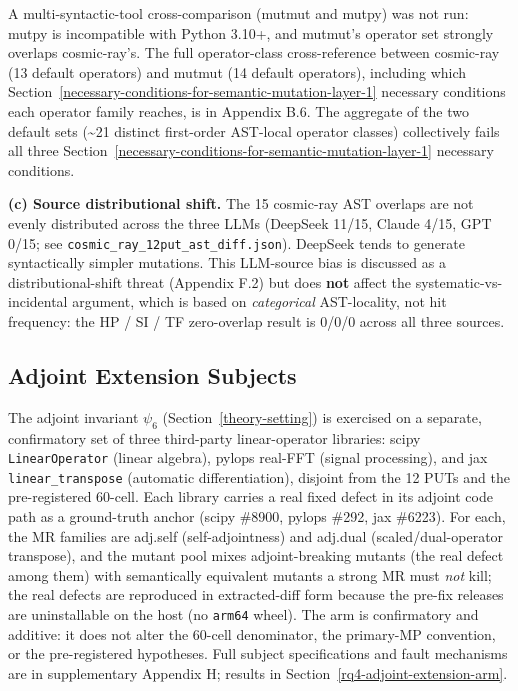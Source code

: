 \documentclass[manuscript,screen,review]{acmart}
\begin{document}
A multi-syntactic-tool cross-comparison (mutmut and mutpy) was not run:
mutpy is incompatible with Python 3.10+, and mutmut's operator
set strongly overlaps cosmic-ray's. The full operator-class
cross-reference between cosmic-ray (13 default operators) and mutmut (14
default operators), including which Section~\ref{necessary-conditions-for-semantic-mutation-layer-1} necessary conditions each
operator family reaches, is in Appendix B.6. The aggregate of the two
default sets (\textasciitilde21 distinct first-order AST-local operator
classes) collectively fails all three Section~\ref{necessary-conditions-for-semantic-mutation-layer-1} necessary conditions.

\textbf{(c) Source distributional shift.} The 15 cosmic-ray AST
overlaps are not evenly distributed across the three LLMs (DeepSeek
11/15, Claude 4/15, GPT 0/15; see
\texttt{cosmic\_ray\_12put\_ast\_diff.json}). DeepSeek tends to generate
syntactically simpler mutations. This LLM-source bias is discussed as a
distributional-shift threat
(Appendix F.2) but does \textbf{not} affect the systematic-vs-incidental
argument, which is based on \emph{categorical} AST-locality, not hit
frequency: the HP / SI / TF zero-overlap result is 0/0/0 across all
three sources.

\subsection{Adjoint Extension Subjects}\label{adjoint-extension-arm-subjects}

The adjoint invariant $\psi_6$ (Section~\ref{theory-setting}) is exercised on a separate,
confirmatory set of three third-party linear-operator libraries:
scipy \texttt{LinearOperator} (linear algebra), pylops real-FFT (signal
processing), and jax \texttt{linear\_transpose} (automatic
differentiation), disjoint from the 12 PUTs and the pre-registered
60-cell. Each library carries a real fixed defect in its adjoint code
path as a ground-truth anchor (scipy \#8900, pylops \#292, jax \#6223).
For each, the MR families are adj.self (self-adjointness) and adj.dual
(scaled/dual-operator transpose), and the mutant pool mixes
adjoint-breaking mutants (the real defect among them) with semantically
equivalent mutants a strong MR must \emph{not} kill; the real defects are
reproduced in extracted-diff form because the pre-fix releases are
uninstallable on the host (no \texttt{arm64} wheel). The arm is
confirmatory and additive: it does not alter the 60-cell denominator, the
primary-MP convention, or the pre-registered hypotheses. Full subject
specifications and fault mechanisms are in supplementary Appendix H;
results in Section~\ref{rq4-adjoint-extension-arm}.
\end{document}
